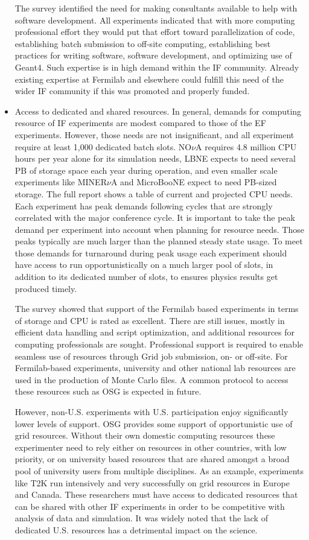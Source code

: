 \begin{itemize}
The survey identified the need for making consultants available to help with
software development. All experiments indicated that with more computing
professional effort they would put that effort toward parallelization of code,
establishing batch submission to off-site computing, establishing best
practices for writing software, software development, and  optimizing use of
Geant4. Such expertise is in high demand within the IF community. Already
existing expertise at Fermilab and elsewhere could fulfill this need of the
wider IF community if this was promoted and properly funded.

\item Access to dedicated and shared resources.  In general, demands for
computing resource of IF experiments are modest compared to those of the EF
experiments.  However, those needs are not insignificant, and all experiment
require at least 1,000 dedicated batch slots.  NO$\nu$A requires 4.8 million
CPU hours per year alone for its simulation needs, LBNE expects to need
several PB of storage space each year during operation, and even smaller scale
experiments like MINER$\nu$A and MicroBooNE expect to need PB-sized storage.
The full report shows a table of current and projected CPU needs. Each
experiment has peak demands following cycles that are strongly correlated with
the major conference cycle.  It is important to take the peak demand per
experiment into account when planning for resource needs. Those peaks
typically are much larger than the planned steady state usage. To meet those
demands for turnaround during peak usage each experiment should have access to
run opportunistically on a much larger pool of slots, in addition to its
dedicated number of slots, to ensures physics results get produced timely.

The survey showed that support of the Fermilab based experiments in terms of
storage and CPU is rated as excellent.  There are still issues, mostly in
efficient data handling and script optimization, and additional resources for
computing professionals are sought.  Professional support is required to
enable seamless use of resources through Grid job submission, on- or off-site.
For Fermilab-based experiments, university and other national lab resources
are used in the production of Monte Carlo files. A common protocol to access
these resources such as OSG is expected in future.

However, non-U.S. experiments with U.S. participation enjoy significantly
lower levels of support. OSG provides some support of opportunistic use of
grid resources.  Without their own domestic computing resources these
experimenter need to rely either on resources in other countries, with low
priority, or on university based resources that are shared amongst a broad
pool of university users from multiple disciplines. As an example, experiments
like T2K run intensively and very successfully on grid resources in Europe and
Canada.   These researchers must have access to dedicated resources that can
be shared with other IF experiments in order to be competitive with analysis
of data and simulation. It was widely noted that the lack of dedicated U.S.
resources has a detrimental impact on the science.


\end{itemize}

